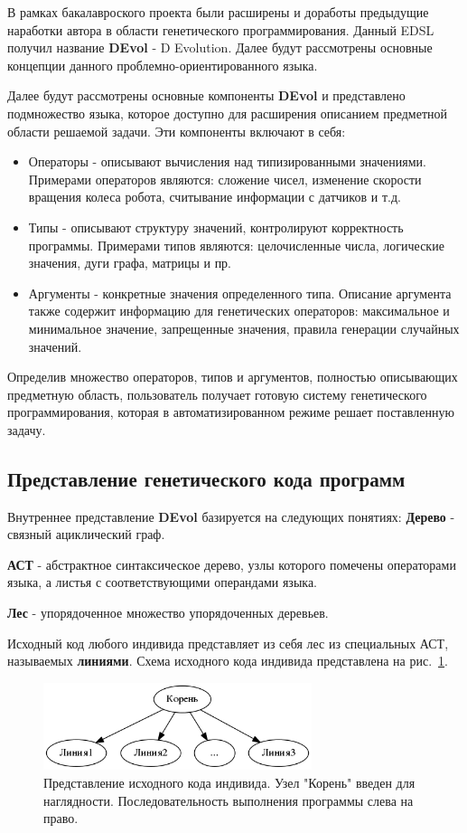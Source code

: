 \documentclass[russian,utf8,emptystyle]{eskdtext}
\begin{document}
\begin{spacing}{1.5}
В рамках бакалавроского проекта были расширены и доработы предыдущие наработки автора в области генетического программирования. Данный EDSL получил название \textbf{DEvol} - D Evolution. Далее будут рассмотрены основные концепции данного проблемно-ориентированного языка.

Далее будут рассмотрены основные компоненты \textbf{DEvol} и представлено подмножество языка, которое доступно для расширения описанием предметной области решаемой задачи. Эти компоненты включают в себя:
\begin{itemize}
\item Операторы - описывают вычисления над типизированными значениями. Примерами операторов являются: сложение чисел, изменение скорости вращения колеса робота, считывание информации с датчиков и т.д.
\item Типы - описывают структуру значений, контролируют корректность программы. Примерами типов являются: целочисленные числа, логические значения, дуги графа, матрицы и пр.
\item Аргументы - конкретные значения определенного типа. Описание аргумента также содержит информацию для генетических операторов: максимальное и минимальное значение, запрещенные значения, правила генерации случайных значений.
\end{itemize}

Определив множество операторов, типов и аргументов, полностью описывающих предметную область, пользователь получает готовую систему генетического программирования, которая в автоматизированном режиме решает поставленную задачу.

\subsection{Представление генетического кода программ}
Внутреннее представление \textbf{DEvol} базируется на следующих понятиях:
\textbf{Дерево} - связный ациклический граф.

\textbf{АСТ} - абстрактное синтаксическое дерево, узлы которого помечены операторами языка, а листья с соответствующими операндами языка.

\textbf{Лес} - упорядоченное множество упорядоченных деревьев.

Исходный код любого индивида представляет из себя лес из специальных АСТ, называемых \textbf{линиями}. Схема исходного кода индивида представлена на рис.~\ref{fig:individ-tree-example}. 

\begin{figure}[h!]
\centering
\includegraphics[width=0.7\textwidth]{individ-tree-example.png}
\caption{Представление исходного кода индивида. Узел "Корень" введен для наглядности. Последовательность выполнения программы слева на право.}
\label{fig:individ-tree-example}
\end{figure}


\end{spacing}
\end{document}
